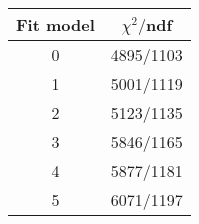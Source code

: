\begin{tabular}{c|c}
Fit model & $\chi^2/$ndf \\
\hline
0 & 4895/1103\\
1 & 5001/1119\\
2 & 5123/1135\\
3 & 5846/1165\\
4 & 5877/1181\\
5 & 6071/1197\\
\end{tabular}
